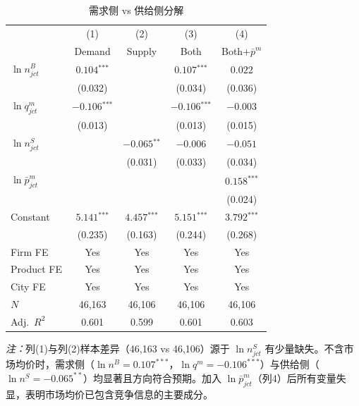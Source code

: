 \documentclass[12pt]{article}
\newcommand{\sym}[1]{\ensuremath{^{\text{#1}}}}
\newcommand{\se}[1]{{\small(#1)}}
\newcommand{\mis}{}
\begin{document}
\begin{table}[H]
\centering\small
\begin{threeparttable}
\caption{需求侧 vs 供给侧分解}
\begin{tabular}{l *{4}{c}}
\toprule
 & (1) & (2) & (3) & (4) \\
 & Demand & Supply & Both & Both$+\bar{p}^{m}$ \\
\midrule
$\ln n^{B}_{jct}$
  & $0.104\sym{***}$ & \mis & $0.107\sym{***}$ & $0.022$ \\
  & \se{0.032} & & \se{0.034} & \se{0.036} \\[3pt]
$\ln q^{m}_{jct}$
  & $-0.106\sym{***}$ & \mis & $-0.106\sym{***}$ & $-0.003$ \\
  & \se{0.013} & & \se{0.013} & \se{0.015} \\[3pt]
$\ln n^{S}_{jct}$
  & \mis & $-0.065\sym{**}$ & $-0.006$ & $-0.051$ \\
  & & \se{0.031} & \se{0.033} & \se{0.034} \\[3pt]
$\ln\bar{p}^{m}_{jct}$
  & \mis & \mis & \mis & $0.158\sym{***}$ \\
  & & & & \se{0.024} \\[3pt]
Constant
  & $5.141\sym{***}$ & $4.457\sym{***}$ & $5.151\sym{***}$ & $3.792\sym{***}$ \\
  & \se{0.235} & \se{0.163} & \se{0.244} & \se{0.268} \\
\midrule
Firm FE    & Yes & Yes & Yes & Yes \\
Product FE & Yes & Yes & Yes & Yes \\
City FE    & Yes & Yes & Yes & Yes \\
$N$        & 46,163 & 46,106 & 46,106 & 46,106 \\
Adj.\ $R^{2}$ & 0.601 & 0.599 & 0.601 & 0.603 \\
\bottomrule
\end{tabular}
\begin{tablenotes}\small
\item \textit{注：}列(1)与列(2)样本差异（46,163 vs 46,106）源于 $\ln n^{S}_{jct}$ 有少量缺失。不含市场均价时，需求侧（$\ln n^{B}=0.107^{***}$，$\ln q^{m}=-0.106^{***}$）与供给侧（$\ln n^{S}=-0.065^{**}$）均显著且方向符合预期。加入 $\ln\bar{p}^{m}_{jct}$（列4）后所有变量失显，表明市场均价已包含竞争信息的主要成分。
\end{tablenotes}
\end{threeparttable}
\end{table}

\clearpage
\end{document}
